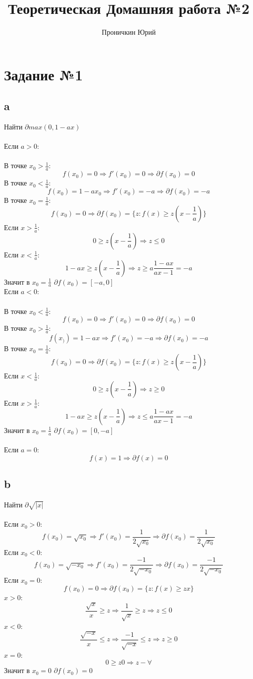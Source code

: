 \documentclass[12pt,a4paper,oneside]{scrartcl}
\begin{document}
\title{Теоретическая Домашняя работа №2}
\author{Проничкин Юрий}
\maketitle

\section{Задание №1}
\subsection{a}
Найти $\partial max(0,1 - ax)$ \\
\\
Если $a > 0$: \\
\\
В точке $x_0 > \frac{1}{a}$: $$f(x_0) = 0 \Rightarrow f'(x_0) = 0 \Rightarrow \partial f(x_0) = 0$$
В точке $x_0 < \frac{1}{a}$: $$f(x_0) = 1 - ax_0 \Rightarrow f'(x_0) = -a \Rightarrow \partial f(x_0) = -a$$
В точке $x_0 = \frac{1}{a}$:
$$f(x_0) = 0 \Rightarrow \partial f(x_0) = \{z: f(x) \geq z(x - \frac{1}{a})\} $$
Если $x > \frac{1}{a}$: $$ 0 \geq z(x - \frac{1}{a}) \Rightarrow z \leq 0 $$
Если $x < \frac{1}{a}$: $$ 1 - ax \geq z(x - \frac{1}{a}) \Rightarrow z \geq a\frac{1 - ax}{ax - 1} = - a$$
Значит в $x_0 = \frac{1}{a}$ $\partial f(x_0) = [-a,0]$ \\
Если $a < 0$: \\
\\
В точке $x_0 < \frac{1}{a}$: $$f(x_0) = 0 \Rightarrow f'(x_0) = 0 \Rightarrow \partial f(x_0) = 0$$
В точке $x_0 > \frac{1}{a}$: $$f(x_)) = 1 - ax \Rightarrow f'(x_0) = -a \Rightarrow \partial f(x_0) = -a$$
В точке $x_0 = \frac{1}{a}$:
$$f(x_0) = 0 \Rightarrow \partial f(x_0) = \{z: f(x) \geq z(x - \frac{1}{a})\} $$
Если $x < \frac{1}{a}$: $$ 0 \geq z(x - \frac{1}{a}) \Rightarrow z \geq 0 $$
Если $x > \frac{1}{a}$: $$ 1 - ax \geq z(x - \frac{1}{a}) \Rightarrow z \leq a\frac{1 - ax}{ax - 1} = - a$$
Значит в $x_0 = \frac{1}{a}$ $\partial f(x_0) = [0,-a]$ \\
\\
Если $a = 0$: $$f(x) = 1 \Rightarrow \partial f(x) = 0 $$
\subsection{b}
Найти $\partial \sqrt{|x|}$ \\ \\
Если $ x_0 > 0 $:
$$f(x_0) = \sqrt{x_0} \Rightarrow f'(x_0) = \frac{1}{2\sqrt{x_0}} \Rightarrow \partial f(x_0) = \frac{1}{2\sqrt{x_0}}$$
Если $ x_0 < 0 $:
$$f(x_0) = \sqrt{-x_0} \Rightarrow f'(x_0) = \frac{-1}{2\sqrt{-x_0}} \Rightarrow \partial f(x_0) = \frac{-1}{2\sqrt{-x_0}}$$
Если $ x_0 = 0 $:
$$f(x_0) = 0 \Rightarrow \partial f(x_0) = \{z: f(x) \geq zx \} $$
$x > 0$:
$$ \frac{\sqrt{x}}{x} \geq z \Rightarrow \frac{1}{\sqrt{x}} \geq z \Rightarrow z \leq 0$$
$x < 0$:
$$ \frac{\sqrt{-x}}{x} \leq z \Rightarrow \frac{-1}{\sqrt{-x}} \leq z \Rightarrow z \geq 0$$
$x = 0$:
$$ 0 \geq z0 \Rightarrow z - \forall $$
Значит в $x_0 = 0 $ $\partial f(x_0) = 0$
\end{document}
